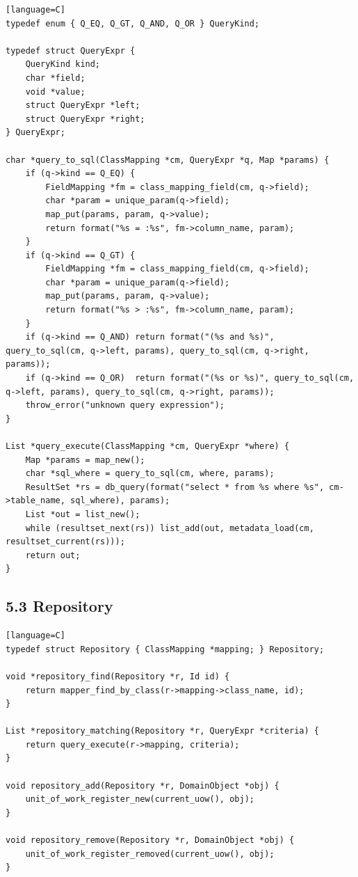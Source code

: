 \documentclass[11pt]{article}
\begin{document}
\begin{verbatim}[language=C]
typedef enum { Q_EQ, Q_GT, Q_AND, Q_OR } QueryKind;

typedef struct QueryExpr {
    QueryKind kind;
    char *field;
    void *value;
    struct QueryExpr *left;
    struct QueryExpr *right;
} QueryExpr;

char *query_to_sql(ClassMapping *cm, QueryExpr *q, Map *params) {
    if (q->kind == Q_EQ) {
        FieldMapping *fm = class_mapping_field(cm, q->field);
        char *param = unique_param(q->field);
        map_put(params, param, q->value);
        return format("%s = :%s", fm->column_name, param);
    }
    if (q->kind == Q_GT) {
        FieldMapping *fm = class_mapping_field(cm, q->field);
        char *param = unique_param(q->field);
        map_put(params, param, q->value);
        return format("%s > :%s", fm->column_name, param);
    }
    if (q->kind == Q_AND) return format("(%s and %s)", query_to_sql(cm, q->left, params), query_to_sql(cm, q->right, params));
    if (q->kind == Q_OR)  return format("(%s or %s)", query_to_sql(cm, q->left, params), query_to_sql(cm, q->right, params));
    throw_error("unknown query expression");
}

List *query_execute(ClassMapping *cm, QueryExpr *where) {
    Map *params = map_new();
    char *sql_where = query_to_sql(cm, where, params);
    ResultSet *rs = db_query(format("select * from %s where %s", cm->table_name, sql_where), params);
    List *out = list_new();
    while (resultset_next(rs)) list_add(out, metadata_load(cm, resultset_current(rs)));
    return out;
}
\end{verbatim}

\subsection{5.3 Repository}\label{repository}

\begin{verbatim}[language=C]
typedef struct Repository { ClassMapping *mapping; } Repository;

void *repository_find(Repository *r, Id id) {
    return mapper_find_by_class(r->mapping->class_name, id);
}

List *repository_matching(Repository *r, QueryExpr *criteria) {
    return query_execute(r->mapping, criteria);
}

void repository_add(Repository *r, DomainObject *obj) {
    unit_of_work_register_new(current_uow(), obj);
}

void repository_remove(Repository *r, DomainObject *obj) {
    unit_of_work_register_removed(current_uow(), obj);
}
\end{verbatim}
\end{document}
